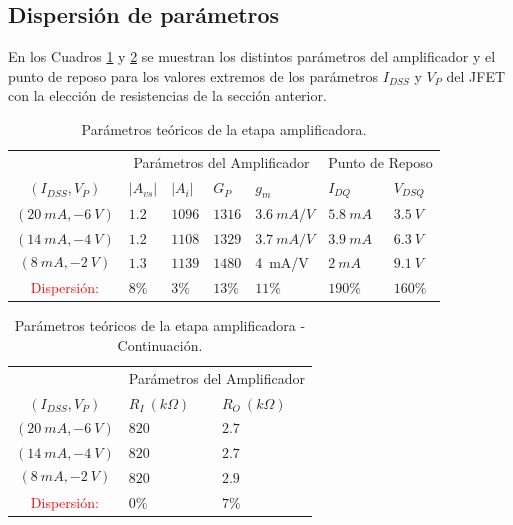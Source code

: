 \documentclass[a4paper, 10pt, spanish]{article}
\begin{document}
\subsection{Dispersión de parámetros}

En los Cuadros \ref{tab:dispersion} y \ref{tab:dispersion2} se muestran los distintos parámetros del amplificador y el punto de reposo para los valores extremos de los parámetros $I_{DSS}$ y $V_P$ del JFET con la elección de resistencias de la sección anterior.



\begin{table}[h]
\centering
\begin{tabularx}{1\textwidth}{XXXXXXXX}
\hline
\multicolumn{2}{c}{}				& \multicolumn{4}{c}{Parámetros del Amplificador}						& \multicolumn{2}{c}{Punto de Reposo} \\
									\cmidrule(r){3-6}														\cmidrule(r){7-8}
\multicolumn{2}{c}{$(I_{DSS},V_{P})$}& $|A_{vs}|$  		& $|A_{i}|$ 		& $G_P$ 			& $g_m$ 		& $I_{DQ}$ 			& $V_{DSQ}$			\\
\cmidrule(r){1-2}  									\cmidrule(r){3-3} \cmidrule(r){4-4} 	\cmidrule(r){5-5} 	\cmidrule(r){6-6} \cmidrule(r){7-7} 	\cmidrule(r){8-8}
\multicolumn{2}{c}{$(20\ mA,-6\ V)$}& $1.2$	& $1096$	& $1316$ & $3.6\ mA/V$ & $5.8\ mA$& $3.5\ V$\\
\hline
\multicolumn{2}{c}{$(14\ mA,-4\ V)$}& $1.2$	& $1108$	& $1329$ & $3.7\ mA/V$& $3.9\ mA$ & $6.3\ V$\\
\hline
\multicolumn{2}{c}{$$(8\ mA,-2\ V)$$}&$1.3$	& $1139$	& $1480$ & 4\ mA/V & $2\ mA$ & $9.1\ V$ \\
\hline
\hline
\multicolumn{2}{c}{\textcolor{red}{Dispersión:}} & $8\%$ & $3\%$ & $13\%$ & $11\%$ & $190\%$ & $160\% $\\
\hline
\end{tabularx}
\caption{Parámetros teóricos de la etapa amplificadora.}
\label{tab:dispersion}
\end{table}


\begin{table}[h]
\centering
\begin{tabularx}{0.5\textwidth}{XXXX}
\hline
\multicolumn{2}{c}{}				& \multicolumn{2}{c}{Parámetros del Amplificador}					 \\
									\cmidrule(r){3-4}
\multicolumn{2}{c}{$(I_{DSS},V_{P})$}& $R_I\ (k\Omega)$  		& $R_O\ (k\Omega)$ 				\\
\cmidrule(r){1-2}  									\cmidrule(r){3-3} \cmidrule(r){4-4}
\multicolumn{2}{c}{$(20\ mA,-6\ V)$}& $820$	& $2.7$	\\
\hline
\multicolumn{2}{c}{$(14\ mA,-4\ V)$}& $820$	& $2.7$	\\
\hline
\multicolumn{2}{c}{$$(8\ mA,-2\ V)$$}&$820$	& $2.9$	\\
\hline
\hline
\multicolumn{2}{c}{\textcolor{red}{Dispersión:}} & $0\%$ & $7\%$ \\
\hline
\end{tabularx}
\caption{Parámetros teóricos de la etapa amplificadora - Continuación.}
\label{tab:dispersion2}
\end{table}
\end{document}
